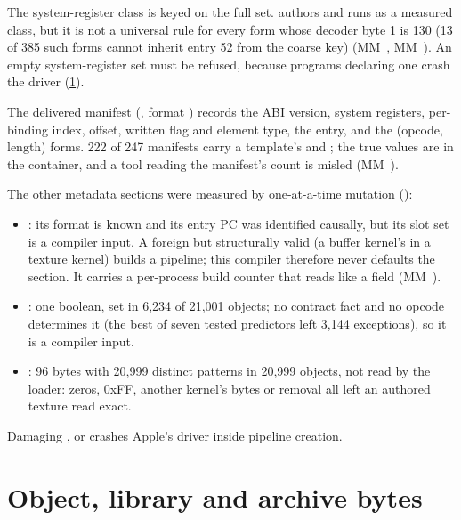 The system-register class is keyed on the full set.  authors and runs as a measured class, but it
is not a universal rule for every form whose decoder byte 1 is 130 (13 of 385 such forms cannot inherit entry 52 from the
coarse key) (MM~, MM~). An empty system-register set must be refused, because programs declaring one
crash the driver (\cref{sec:object-library-archive}).

The delivered manifest (, format ) records the ABI version, system registers,
per-binding index, offset, written flag and element type, the entry, and the (opcode, length) forms. 222 of 247 manifests
carry a template's  and ; the true values are in the container, and a tool reading the
manifest's count is misled (MM~).

The other metadata sections were measured by one-at-a-time mutation ():

\begin{itemize}
\item {}: its format is known and its entry PC was identified causally, but its slot set is a compiler input. A foreign but
  structurally valid  (a buffer kernel's in a texture kernel) builds a pipeline; this compiler therefore never defaults the
  section. It carries a per-process build counter that reads like a field (MM~).
\item {}: one boolean, set in 6,234 of 21,001 objects; no contract fact and no opcode determines it (the
  best of seven tested predictors left 3,144 exceptions), so it is a compiler input.
\item {}: 96 bytes with 20,999 distinct patterns in 20,999 objects, not read by the loader: zeros, 0xFF,
  another kernel's bytes or removal all left an authored texture read exact.
\end{itemize}

Damaging ,  or  crashes Apple's driver inside
pipeline creation.

\section{Object, library and archive bytes}\label{sec:object-library-archive}



